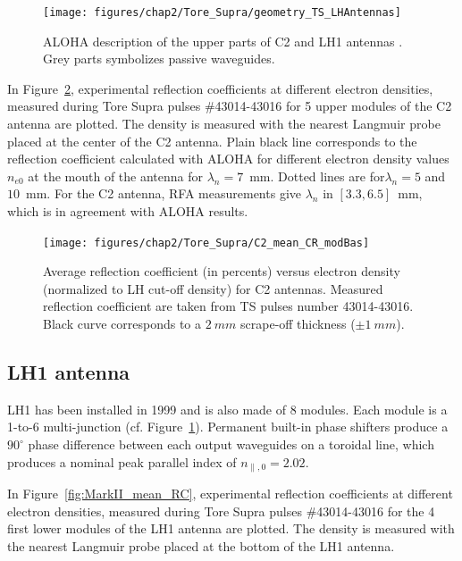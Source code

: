 \begin{figure}[h]
	\centering
	\texttt{[image: figures/chap2/Tore\_Supra/geometry\_TS\_LHAntennas]}
	\caption{ALOHA description of the upper parts of C2 and LH1 antennas . Grey parts symbolizes passive waveguides.}
	\label{fig:geometry_TS_LHAntennas}
\end{figure}

In Figure~\ref{fig:MarkI_mean_RC}, experimental reflection coefficients at different electron densities, measured during Tore Supra pulses \#43014-43016 for 5 upper modules of the C2 antenna are plotted. The density is measured with the nearest Langmuir probe placed at the center of the C2 antenna. Plain black line corresponds to the reflection coefficient calculated with ALOHA for different electron density values $n_{e0}$ at the mouth of the antenna for $\lambda_n=7$~mm. Dotted lines are for$\lambda_n=5$ and $10$~mm. For the C2 antenna, RFA measurements give $\lambda_n$ in $[3.3, 6.5]$~mm, which is in agreement with ALOHA results. 

\begin{figure}[h]
	\centering
	\texttt{[image: figures/chap2/Tore\_Supra/C2\_mean\_CR\_modBas]}
	\caption{Average reflection  coefficient (in percents) versus electron density (normalized to LH cut-off density) for C2 antennas. Measured reflection  coefficient are taken from TS pulses number 43014-43016. Black curve corresponds to a $2~mm$ scrape-off thickness ($\pm 1~mm$).}
	\label{fig:MarkI_mean_RC}
\end{figure}

\subsection{LH1 antenna}
LH1 has been installed in 1999 and is also made of 8 modules. Each module is a 1-to-6 multi-junction (cf. Figure~\ref{fig:geometry_TS_LHAntennas}). Permanent built-in phase shifters produce a $90^\circ$ phase difference between each output waveguides on a toroidal line, which produces a nominal peak parallel index of $n_{\parallel,0}=2.02$.

In Figure~\ref{fig:MarkII_mean_RC}, experimental reflection coefficients at different electron densities, measured during Tore Supra pulses \#43014-43016 for the 4 first lower modules of the LH1 antenna are plotted. The density is measured with the nearest Langmuir probe placed at the bottom of the LH1 antenna. 

